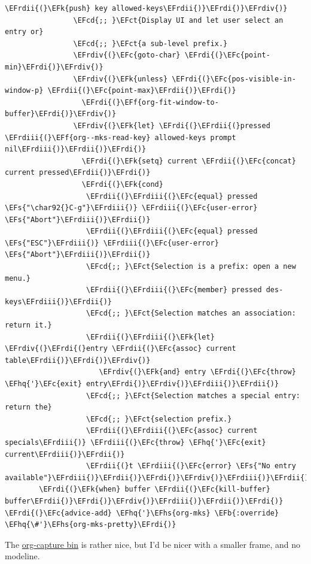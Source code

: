 \documentclass{scrartcl}
\newcommand{\EFk}[1]{\textcolor{EFk}{#1}} %
\newcommand{\EFs}[1]{\textcolor{EFs}{#1}} %
\newcommand{\EFb}[1]{\textcolor{EFb}{#1}} %
\newcommand{\EFct}[1]{\textcolor{EFct}{#1}} %
\newcommand{\EFc}[1]{\textcolor{EFc}{#1}} %
\newcommand{\EFf}[1]{\textcolor{EFf}{#1}} %
\newcommand{\EFcd}[1]{\textcolor{EFcd}{#1}} %
\newcommand{\EFhq}[1]{#1} %
\newcommand{\EFhs}[1]{#1} %
\newcommand{\EFrdi}[1]{#1} %
\newcommand{\EFrdii}[1]{#1} %
\newcommand{\EFrdiii}[1]{#1} %
\newcommand{\EFrdiv}[1]{#1} %
\begin{document}
\begin{Code}
\begin{Verbatim}[]
                    \EFrdii{(}\EFk{push} key allowed-keys\EFrdii{)}\EFrdi{)}\EFrdiv{)}
                \EFcd{;; }\EFct{Display UI and let user select an entry or}
                \EFcd{;; }\EFct{a sub-level prefix.}
                \EFrdiv{(}\EFc{goto-char} \EFrdi{(}\EFc{point-min}\EFrdi{)}\EFrdiv{)}
                \EFrdiv{(}\EFk{unless} \EFrdi{(}\EFc{pos-visible-in-window-p} \EFrdii{(}\EFc{point-max}\EFrdii{)}\EFrdi{)}
                  \EFrdi{(}\EFf{org-fit-window-to-buffer}\EFrdi{)}\EFrdiv{)}
                \EFrdiv{(}\EFk{let} \EFrdi{(}\EFrdii{(}pressed \EFrdiii{(}\EFf{org--mks-read-key} allowed-keys prompt nil\EFrdiii{)}\EFrdii{)}\EFrdi{)}
                  \EFrdi{(}\EFk{setq} current \EFrdii{(}\EFc{concat} current pressed\EFrdii{)}\EFrdi{)}
                  \EFrdi{(}\EFk{cond}
                   \EFrdii{(}\EFrdiii{(}\EFc{equal} pressed \EFs{"\char92{}C-g"}\EFrdiii{)} \EFrdiii{(}\EFc{user-error} \EFs{"Abort"}\EFrdiii{)}\EFrdii{)}
                   \EFrdii{(}\EFrdiii{(}\EFc{equal} pressed \EFs{"ESC"}\EFrdiii{)} \EFrdiii{(}\EFc{user-error} \EFs{"Abort"}\EFrdiii{)}\EFrdii{)}
                   \EFcd{;; }\EFct{Selection is a prefix: open a new menu.}
                   \EFrdii{(}\EFrdiii{(}\EFc{member} pressed des-keys\EFrdiii{)}\EFrdii{)}
                   \EFcd{;; }\EFct{Selection matches an association: return it.}
                   \EFrdii{(}\EFrdiii{(}\EFk{let} \EFrdiv{(}\EFrdi{(}entry \EFrdii{(}\EFc{assoc} current table\EFrdii{)}\EFrdi{)}\EFrdiv{)}
                      \EFrdiv{(}\EFk{and} entry \EFrdi{(}\EFc{throw} \EFhq{'}\EFc{exit} entry\EFrdi{)}\EFrdiv{)}\EFrdiii{)}\EFrdii{)}
                   \EFcd{;; }\EFct{Selection matches a special entry: return the}
                   \EFcd{;; }\EFct{selection prefix.}
                   \EFrdii{(}\EFrdiii{(}\EFc{assoc} current specials\EFrdiii{)} \EFrdiii{(}\EFc{throw} \EFhq{'}\EFc{exit} current\EFrdiii{)}\EFrdii{)}
                   \EFrdii{(}t \EFrdiii{(}\EFc{error} \EFs{"No entry available"}\EFrdiii{)}\EFrdii{)}\EFrdi{)}\EFrdiv{)}\EFrdiii{)}\EFrdii{)}\EFrdi{)}
        \EFrdi{(}\EFk{when} buffer \EFrdii{(}\EFc{kill-buffer} buffer\EFrdii{)}\EFrdi{)}\EFrdiv{)}\EFrdiii{)}\EFrdii{)}\EFrdi{)}
\EFrdi{(}\EFc{advice-add} \EFhq{'}\EFhs{org-mks} \EFb{:override} \EFhq{\#'}\EFhs{org-mks-pretty}\EFrdi{)}
\end{Verbatim}
\end{Code}

The \href{file:///Users/shauryasingh/.emacs.doom/bin/org-capture}{org-capture bin} is rather nice, but I'd be nicer with a smaller frame, and
no modeline.
\end{document}
